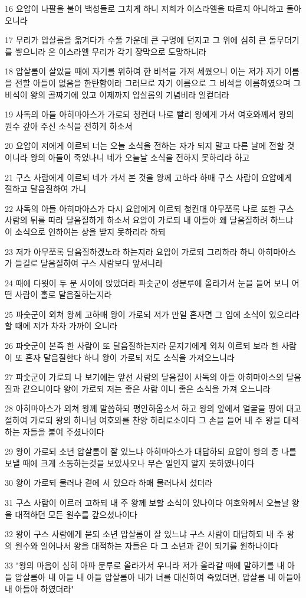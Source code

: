 \par 16 요압이 나팔을 불어 백성들로 그치게 하니 저희가 이스라엘을 따르지 아니하고 돌아오니라
\par 17 무리가 압살롬을 옮겨다가 수풀 가운데 큰 구멍에 던지고 그 위에 심히 큰 돌무더기를 쌓으니라 온 이스라엘 무리가 각기 장막으로 도망하니라
\par 18 압살롬이 살았을 때에 자기를 위하여 한 비석을 가져 세웠으니 이는 저가 자기 이름을 전할 아들이 없음을 한탄함이라 그러므로 자기 이름으로 그 비석을 이름하였으며 그 비석이 왕의 골짜기에 있고 이제까지 압살롬의 기념비라 일컫더라
\par 19 사독의 아들 아히마아스가 가로되 청컨대 나로 빨리 왕에게 가서 여호와께서 왕의 원수 갚아 주신 소식을 전하게 하소서
\par 20 요압이 저에게 이르되 너는 오늘 소식을 전하는 자가 되지 말고 다른 날에 전할 것이니라 왕의 아들이 죽었나니 네가 오늘날 소식을 전하지 못하리라 하고
\par 21 구스 사람에게 이르되 네가 가서 본 것을 왕께 고하라 하매 구스 사람이 요압에게 절하고 달음질하여 가니
\par 22 사독의 아들 아히마아스가 다시 요압에게 이르되 청컨대 아무쪼록 나로 또한 구스 사람의 뒤를 따라 달음질하게 하소서 요압이 가로되 내 아들아 왜 달음질하려 하느냐 이 소식으로 인하여는 상을 받지 못하리라 하되
\par 23 저가 아무쪼록 달음질하겠노라 하는지라 요압이 가로되 그리하라 하니 아히마아스가 들길로 달음질하여 구스 사람보다 앞서니라
\par 24 때에 다윗이 두 문 사이에 앉았더라 파숫군이 성문루에 올라가서 눈을 들어 보니 어떤 사람이 홀로 달음질하는지라
\par 25 파숫군이 외쳐 왕께 고하매 왕이 가로되 저가 만일 혼자면 그 입에 소식이 있으리라 할 때에 저가 차차 가까이 오니라
\par 26 파숫군이 본즉 한 사람이 또 달음질하는지라 문지기에게 외쳐 이르되 보라 한 사람이 또 혼자 달음질한다 하니 왕이 가로되 저도 소식을 가져오느니라
\par 27 파숫군이 가로되 나 보기에는 앞선 사람의 달음질이 사독의 아들 아히마아스의 달음질과 같으니이다 왕이 가로되 저는 좋은 사람 이니 좋은 소식을 가져 오느니라
\par 28 아히마아스가 외쳐 왕께 말씀하되 평안하옵소서 하고 왕의 앞에서 얼굴을 땅에 대고 절하여 가로되 왕의 하나님 여호와를 찬양 하리로소이다 그 손을 들어 내 주 왕을 대적하는 자들을 붙여 주셨나이다
\par 29 왕이 가로되 소년 압살롬이 잘 있느냐 아히마아스가 대답하되 요압이 왕의 종 나를 보낼 때에 크게 소동하는것을 보았사오나 무슨 일인지 알지 못하였나이다
\par 30 왕이 가로되 물러나 곁에 서 있으라 하매 물러나서 섰더라
\par 31 구스 사람이 이르러 고하되 내 주 왕께 보할 소식이 있나이다 여호와께서 오늘날 왕을 대적하던 모든 원수를 갚으셨나이다
\par 32 왕이 구스 사람에게 묻되 소년 압살롬이 잘 있느냐 구스 사람이 대답하되 내 주 왕의 원수와 일어나서 왕을 대적하는 자들은 다 그 소년과 같이 되기를 원하나이다
\par 33 "왕의 마음이 심히 아파 문루로 올라가서 우니라 저가 올라갈 때에 말하기를 내 아들 압살롬아 내 아들 내 아들 압살롬아 내가 너를 대신하여 죽었더면, 압살롬 내 아들아 내 아들아 하였더라"

